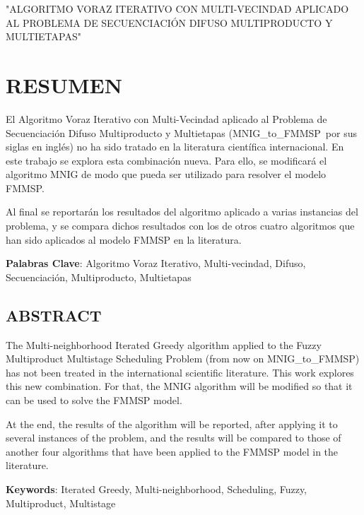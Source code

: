 \documentclass{article}
\def\algmod{MNIG\_to\_FMMSP} %
\begin{document}
"ALGORITMO VORAZ ITERATIVO CON MULTI-VECINDAD APLICADO AL PROBLEMA DE
SECUENCIACIÓN DIFUSO MULTIPRODUCTO Y \linebreak MULTIETAPAS"

\newpage

\section{RESUMEN}

El Algoritmo Voraz Iterativo con Multi-Vecindad aplicado al Problema de
Secuenciación Difuso Multiproducto y Multietapas (\algmod\ por sus siglas
en inglés) no ha sido tratado en la literatura científica internacional.
En este trabajo se explora esta combinación nueva. Para ello, se modificará
el algoritmo MNIG de modo que pueda ser utilizado para resolver el modelo FMMSP.

\vspace{\baselineskip}
Al final se reportarán los resultados del algoritmo aplicado a varias instancias 
del problema, y se compara dichos resultados con los de otros cuatro algoritmos 
que han sido aplicados al modelo FMMSP en la literatura.

\vspace{\baselineskip}
\textbf{Palabras Clave}: Algoritmo Voraz Iterativo, Multi-vecindad,
Difuso, Secuenciación, Multiproducto, Multietapas

\subsection{ABSTRACT}

The Multi-neighborhood Iterated Greedy algorithm applied to the Fuzzy 
Multiproduct Multistage Scheduling Problem (from now on \algmod)
has not been treated in the international scientific literature. This
work explores this new combination. For that, the MNIG algorithm will be
modified so that it can be used to solve the FMMSP model.

\vspace{\baselineskip}
At the end, the results of the algorithm will be reported, after applying it to 
several instances of the problem, and the results will be compared to those of 
another four algorithms that have been applied to the FMMSP model in the 
literature. 

\vspace{\baselineskip}
\par \textbf{Keywords}: Iterated Greedy, Multi-neighborhood, Scheduling, Fuzzy,
Multiproduct, Multistage
\end{document}
